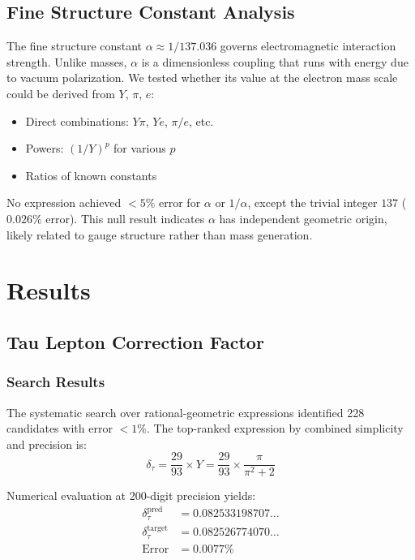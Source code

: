 \documentclass[11pt,a4paper]{article}
\begin{document}
\subsection{Fine Structure Constant Analysis}

The fine structure constant $\alpha \approx 1/137.036$ governs electromagnetic interaction strength. Unlike masses, $\alpha$ is a dimensionless coupling that runs with energy due to vacuum polarization. We tested whether its value at the electron mass scale could be derived from $Y$, $\pi$, $e$:
\begin{itemize}
\item Direct combinations: $Y \pi$, $Y e$, $\pi/e$, etc.
\item Powers: $(1/Y)^p$ for various $p$
\item Ratios of known constants
\end{itemize}
No expression achieved $<5\%$ error for $\alpha$ or $1/\alpha$, except the trivial integer $137$ ($0.026\%$ error). This null result indicates $\alpha$ has independent geometric origin, likely related to gauge structure rather than mass generation.

\section{Results}

\subsection{Tau Lepton Correction Factor}

\subsubsection{Search Results}

The systematic search over rational-geometric expressions identified 228 candidates with error $<1\%$. The top-ranked expression by combined simplicity and precision is:
\begin{equation}
\delta_\tau = \frac{29}{93} \times Y = \frac{29}{93} \times \frac{\pi}{\pi^2 + 2}
\label{eq:delta_tau_solution}
\end{equation}

Numerical evaluation at 200-digit precision yields:
\begin{align}
\delta_\tau^{\text{pred}} &= 0.082533198707\ldots \\
\delta_\tau^{\text{target}} &= 0.082526774070\ldots \\
\text{Error} &= 0.0077\%
\end{align}
\end{document}
